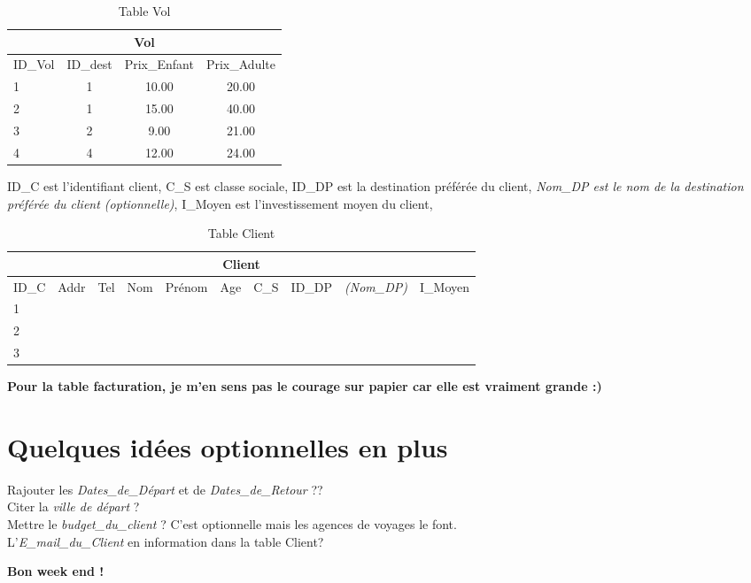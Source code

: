 \documentclass[10pt]{article}
\begin{document}
\begin{table}[h]
\begin{center}
\begin{tabular}{|l|c|c|c|}
\hline
\multicolumn{4}{|c|}{Vol}\\
\hline
ID\_Vol& ID\_dest & Prix\_Enfant& Prix\_Adulte\\
\hline
1 & 1& 10.00 & 20.00\\
\hline
2 & 1& 15.00& 40.00\\
\hline
3 & 2& 9.00& 21.00\\
\hline
4 & 4& 12.00& 24.00\\
\hline
\end{tabular}
\end{center}
\caption{Table Vol}
\end{table}


\begin{table}[h]
ID\_C est l'identifiant client,
C\_S est classe sociale,
ID\_DP est la destination préférée du client,
\textit{Nom\_DP est le nom de la destination préférée du client (optionnelle)},
I\_Moyen est l'investissement moyen du client,
\bigskip

\begin{tabular}{|l|c|c|c|c|c|c|c|c|c|}
\hline
\multicolumn{10}{|c|}{Client}\\
\hline
ID\_C& Addr& Tel & Nom & Prénom & Age & C\_S & ID\_DP &\textit{(Nom\_DP)}&I\_Moyen\\
\hline
1 & & &&  &  & &&&\\
\hline
2 & & &&  &  & &&&\\
\hline
3 & & &&  &  & &&&\\
\hline
\end{tabular}
\caption{Table Client}
\end{table}


\textbf{Pour la table facturation, je m'en sens pas le courage sur papier car elle est vraiment grande :) }

\section{Quelques idées optionnelles en plus}
Rajouter les \textit{Dates\_de\_Départ} et de \textit{Dates\_de\_Retour} ?? \\
Citer la \textit{ville de départ} ? \\
Mettre le \textit{budget\_du\_client} ? C'est optionnelle mais les agences de voyages le font. \\
L'\textit{E\_mail\_du\_Client} en information dans la table Client? 

\textbf{Bon week end !}
\end{document}
